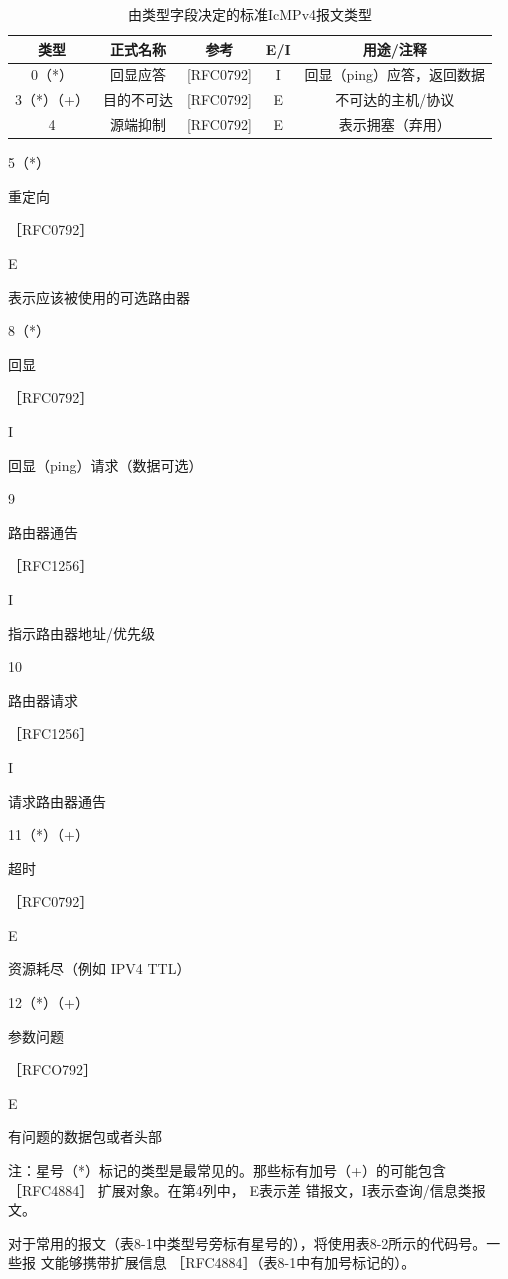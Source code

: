 \begin{table}[]
	\caption{由类型字段决定的标准IcMPv4报文类型}
	\centering
	\begin{tabular}{c|c|c|c|c}
		\hline
		类型      & 正式名称  & 参考        & E/I & 用途/注释           \\ \hline
		0（*）    & 回显应答  & [RFC0792] & I   & 回显（ping）应答，返回数据 \\ \hline
		3（*）（+） & 目的不可达 & [RFC0792] & E   & 不可达的主机/协议       \\ \hline
		4       & 源端抑制  & [RFC0792] & E   & 表示拥塞（弃用）        \\ \hline
	\end{tabular}
\end{table}


5（*）

重定向

［RFC0792］

E

表示应该被使用的可选路由器

8（*）

回显

［RFC0792］

I

回显（ping）请求（数据可选）

9

路由器通告

［RFC1256］

I

指示路由器地址/优先级

10

路由器请求

［RFC1256］

I

请求路由器通告

11（*）（+）

超时

［RFC0792］

E

资源耗尽（例如 IPV4 TTL）

12（*）（+）

参数问题

［RFCO792］

E

有问题的数据包或者头部

注：星号（*）标记的类型是最常见的。那些标有加号（+）的可能包含［RFC4884］ 扩展对象。在第4列中，
E表示差 错报文，I表示查询/信息类报文。

对于常用的报文（表8-1中类型号旁标有星号的），将使用表8-2所示的代码号。一些报
文能够携带扩展信息 ［RFC4884］（表8-1中有加号标记的）。

